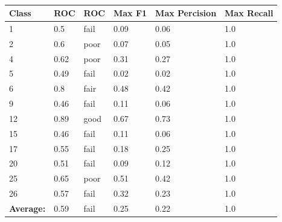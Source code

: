     \begin{table}[!h]
    \centering
    {\small
    \begin{tabular}{llllll}
    \hline
    \textbf{Class}    & \textbf{ROC} & \textbf{ROC} & \textbf{Max F1} & \textbf{Max Percision} & \textbf{Max Recall} \\ \hline
    1                 & 0.5          & fail         & 0.09            & 0.06                   & 1.0                 \\
    2                 & 0.6          & poor         & 0.07            & 0.05                   & 1.0                 \\
    4                 & 0.62         & poor         & 0.31            & 0.27                   & 1.0                 \\
    5                 & 0.49         & fail         & 0.02            & 0.02                   & 1.0                 \\
    6                 & 0.8          & fair         & 0.48            & 0.42                   & 1.0                 \\
    9                 & 0.46         & fail         & 0.11            & 0.06                   & 1.0                 \\
    12                & 0.89         & good         & 0.67            & 0.73                   & 1.0                 \\
    15                & 0.46         & fail         & 0.11            & 0.06                   & 1.0                 \\
    17                & 0.55         & fail         & 0.18            & 0.25                   & 1.0                 \\
    20                & 0.51         & fail         & 0.09            & 0.12                   & 1.0                 \\
    25                & 0.65         & poor         & 0.51            & 0.42                   & 1.0                 \\
    26                & 0.57         & fail         & 0.32            & 0.23                   & 1.0                 \\ \hline
    \textbf{Average:} & 0.59         & fail         & 0.25            & 0.22                   & 1.0                 \\ \hline
    \end{tabular} }
    \caption{}
    \label{my-label}
    \end{table}


